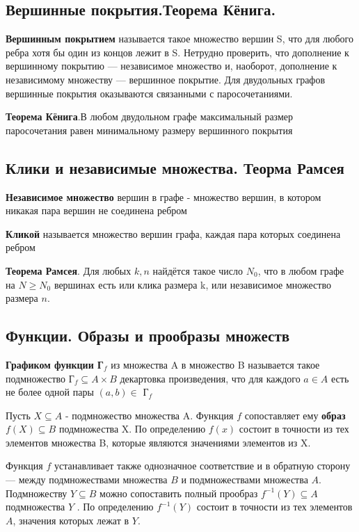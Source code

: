 \documentclass[a4paper, 10pt]{article}
\begin{document}
\subsection{Вершинные покрытия.Теорема Кёнига.}


\textbf{Вершинным покрытием} называется такое множество вершин S, что для любого ребра хотя бы один из концов лежит в S. Нетрудно проверить, что дополнение к вершинному покрытию — независимое множество и, наоборот, дополнение к независимому множеству — вершинное покрытие. Для двудольных графов вершинные покрытия оказываются связанными с паросочетаниями.


\textbf{Теорема Кёнига}.В любом двудольном графе максимальный размер паросочетания равен минимальному размеру вершинного покрытия


\subsection{Клики и независимые множества. Теорма Рамсея}


\textbf{Независимое множество} вершин в графе - множество вершин, в котором никакая пара вершин не соединена ребром


\textbf{Кликой} называется множество вершин графа, каждая пара которых соединена ребром


\textbf{Теорема Рамсея}. Для любых $k, n$ найдётся такое число $N_0$, что в любом графе на $N \geqslant N_0$ вершинах есть или клика размера k, или независимое множество размера $n$.


\subsection{Функции. Образы и прообразы множеств}

\textbf{Графиком функции Г$_f$} из множества A в множество B называется такое подмножество Г$_f \subseteq A \times B$ декартовка произведения, что для каждого $a \in A$ есть не более одной пары $(a, b) \in$ Г$_f$

Пусть $X \subseteq A$ - подмножество множества A. Функция $f$ сопоставляет ему \textbf{образ} $f(X) \subseteq B$ подмножества X. По определению $f(x)$ состоит в точности из тех элементов множества B, которые являются значениями элементов из X.

Функция $f$ устанавливает также однозначное соответствие и в обратную сторону — между подмножествами множества $B$ и подмножествами множества $A$. Подмножеству $Y \subseteq B$ можно сопоставить полный прообраз $f^{-1}(Y) \subseteq A$ подмножества $Y$ . По определению $f^{-1}(Y)$ состоит в точности из тех элементов $A$, значения которых лежат в $Y$.
\end{document}
